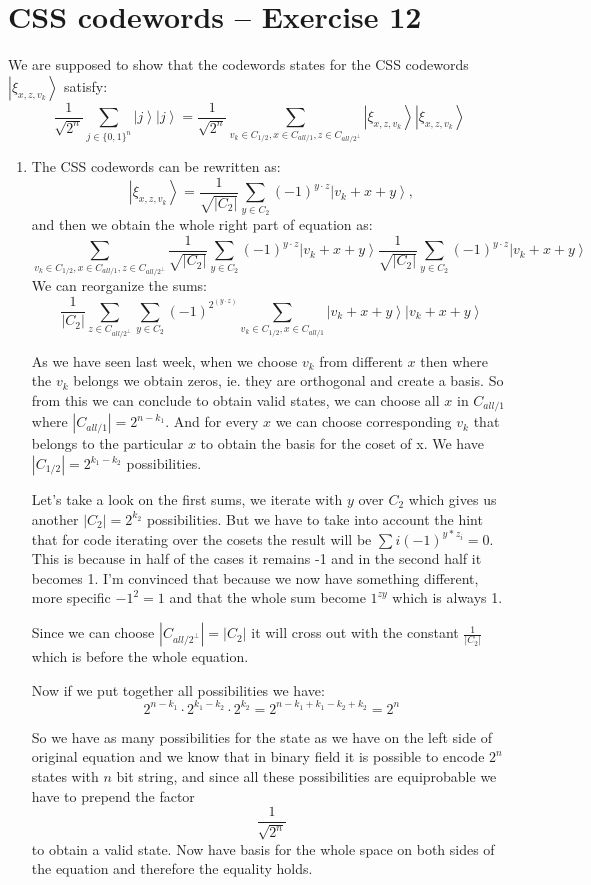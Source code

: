 \documentclass[a4paper,10pt]{article}
\newcommand{\ket}[1]{\ensuremath{\left|#1\right\rangle}} %
\begin{document}
\section*{CSS codewords -- Exercise 12}
We are supposed to show that the codewords states for the CSS codewords \ket{\xi_{x,z,v_k}} satisfy:
$$
\frac{1}{\sqrt{2^n}}\sum_{j\in \{0,1\}^n} \ket{j}\ket{j} = \frac{1}{\sqrt{2^n}}\sum_{v_k \in  C_{1/2},x\in C_{all/1},z \in C_{all/2^\bot}}\ket{\xi_{x,z,v_k}}\ket{\xi_{x,z,v_k}}
$$
\begin{enumerate}[1.]
\item 
The CSS codewords can be rewritten as:
$$
\ket{\xi_{x,z,v_k}} = \frac{1}{\sqrt{|C_2|}} \sum_{y \in C_2} (-1)^{y \cdot z} \ket{v_k + x + y},
$$
and then we obtain the whole right part of equation as:
$$
\sum_{v_k \in  C_{1/2},x\in C_{all/1},z \in C_{all/2^\bot}}\frac{1}{\sqrt{|C_2|}} \sum_{y \in C_2} (-1)^{y \cdot z} \ket{v_k + x + y}\frac{1}{\sqrt{|C_2|}} \sum_{y \in C_2} (-1)^{y \cdot z} \ket{v_k + x + y}
$$
We can reorganize the sums:
$$
\frac{1}{|C_2|}\sum_{z \in C_{all/2^\bot}}\sum_{y \in C_2} (-1)^{2^{(y \cdot z)}}
\sum_{v_k \in  C_{1/2},x\in C_{all/1}} \ket{v_k + x + y}\ket{v_k + x + y}
$$

As we have seen last week, when we choose $v_k$ from different $x$ then where the $v_k$ belongs we obtain zeros, ie. they are orthogonal and create a basis. So from this we can conclude to obtain valid states, we can choose all $x$ in $C_{all/1}$ where $|C_{all/1}| = 2^{n-k_1}$. And for every $x$ we can choose corresponding $v_k$ that belongs to the particular $x$ to obtain the basis for the coset of x. We have $|C_{1/2}|=2^{k_1-k_2}$ possibilities.

Let's take a look on the first sums, we iterate with $y$ over $C_2$ which gives us another $|C_2|=2^{k_2}$ possibilities. But we have to take into account the hint that for code iterating over the cosets the result will be $\sum{i}(-1)^{y*z_i} = 0$. This is because in half of the cases it remains -1 and in the second half it becomes 1.
I'm convinced that because we now have something different, more specific $-1^2=1$ and that the whole sum become $1^{zy}$ which is always 1.

Since we can choose $|C_{all/2^\bot}|=|C_2|$ it will cross out with the constant $\frac{1}{|C_2|}$ which is before the whole equation.

Now if we put together all possibilities we have:
$$
2^{n-k_1}\cdot 2^{k_1-k_2}\cdot 2^{k_2} = 2^{n-k_1+k_1-k_2+k_2} = 2^n
$$

So we have as many possibilities for the state as we have on the left side of original equation and we know that in binary field it is possible to encode $2^n$ states with $n$ bit string, and since all these possibilities are equiprobable we have to prepend the factor
$$
\frac{1}{\sqrt{2^n}}
$$
to obtain a valid state. Now have basis for the whole space on both sides of the equation and therefore the equality holds.

\end{enumerate}
\end{document}

